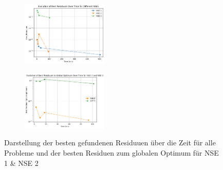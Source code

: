 \documentclass{article}
\theoremstyle{newline}
\begin{document}
\begin{onehalfspace}
\begin{figure}[h]
	\centering
	\begin{subfigure}
		\centering
		\includegraphics[width=0.45\textwidth]{Bilder/BestResiduum_Time_nse1-3.png}
		\label{fig:bestresiduum_time_allnse}
	\end{subfigure}
	\hfill
	\begin{subfigure}
		\centering
		\includegraphics[width=0.45\textwidth]{Bilder/Residuum_globaloptimum_time_nse2-3.png}
		\label{fig:bestresiduum_globaloptimum_time_nse1-2}
	\end{subfigure}
	\caption{Darstellung der besten gefundenen Residuuen über die Zeit für alle Probleme und der besten Residuen zum globalen Optimum für NSE 1 \& NSE 2}
	\label{fig:zusammenstellung}
\end{figure}


\end{onehalfspace}
\end{document}
